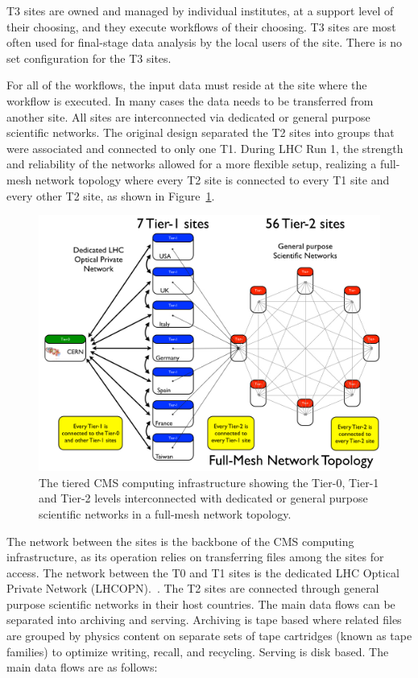 T3 sites are owned and managed by individual institutes, at a support level
of their choosing, and they execute workflows of their choosing.  T3 sites
are most often used for final-stage data analysis by the local users of the
site.  There is no set configuration for the T3 sites.

For all of the workflows, the input data must reside at the site where the
workflow is executed.  In many cases the data needs to be transferred from
another site.  All sites are interconnected via dedicated or general
purpose scientific networks. The original design separated the T2 sites
into groups that were associated and connected to only one T1. During LHC
Run 1, the strength and reliability of the networks allowed for a more
flexible setup, realizing a full-mesh network topology where every T2 site
is connected to every T1 site and every other T2 site, as shown in
Figure~\ref{fig:distributed_topology}.
 
\begin{figure}
\begin{center}
\includegraphics[width=.5\textwidth]{figs/distributed_topology}
\end{center}
\caption{The tiered CMS computing infrastructure showing the Tier-0, Tier-1 and Tier-2 levels interconnected with dedicated or general purpose scientific networks in a full-mesh network topology.
  \label{fig:distributed_topology}}
\end{figure}

The network between the sites is the backbone of the CMS computing
infrastructure, as its operation relies on transferring files among the
sites for access. The network between the T0 and T1 sites is the dedicated
LHC Optical Private Network (LHCOPN).~. The T2 sites are connected through general purpose
scientific networks in their host countries. The main data flows can be
separated into archiving and serving. Archiving is tape based where related
files are grouped by physics content on separate sets of tape cartridges
(known as tape families) to optimize writing, recall, and
recycling. Serving is disk based. The main data flows are as follows:

